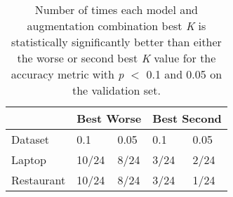 \documentclass[11pt,a4paper]{article}
\begin{document}
\begin{table}[]
\begin{tabular}{|l|p{1cm}|p{1cm}|p{1cm}|p{1cm}|}
\hline
 &  \multicolumn{2}{l|}{Best Worse} & \multicolumn{2}{l|}{Best Second}  \\ 
\hline
Dataset &  0.1 & 0.05 & 0.1 & 0.05 \\ \hline
Laptop & 10/24 & 8/24 & 3/24 & 2/24 \\ \hline
Restaurant & 10/24 & 8/24 & 3/24 & 1/24 \\ \hline
\end{tabular}
\caption{Number of times each model and augmentation combination best \textit{K} is statistically significantly better than either the worse or second best \textit{K} value for the accuracy metric with \textit{p} $<$ 0.1 and 0.05 on the validation set.}
\end{table}
\end{document}

